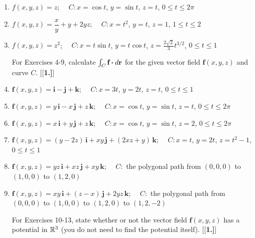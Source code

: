 \begin{enumerate}[\bfseries 1.]
 \item $f(x,y,z)=z$; $\quad C: x=\cos t$, $y=\sin t$, $z=t$, $0 \le t \le 2\pi$
 \item $f(x,y,z)=\dfrac{x}{y} + y + 2yz$; $\quad C: x=t^2$, $y=t$, $z=1$, $1 \le t \le 2$
 \item $f(x,y,z)=z^2$; $\quad C: x=t\sin t$, $y=t\cos t$, $z=\frac{2\sqrt{2}}{3}t^{3/2}$, $0 \le t \le 1$
\par\noindent For Exercises 4-9, calculate $\int_C \textbf{f} \bm{\cdot} d\textbf{r}$ for the given vector
 field $\textbf{f}(x,y,z)$ and curve $C$.
[{[\bfseries 1.]}]
 \item $\textbf{f}(x,y,z) = \textbf{i} - \textbf{j} + \textbf{k}$; $\quad C: x=3t$, $y=2t$, $z=t$, $0 \le t \le 1$
 \item $\textbf{f}(x,y,z) = y\,\textbf{i} - x\,\textbf{j} + z\,\textbf{k}$; $\quad C: x=\cos t$, $y=\sin t$, $z=t$,
  $0 \le t \le 2\pi$
 \item $\textbf{f}(x,y,z) = x\,\textbf{i} + y\,\textbf{j} + z\,\textbf{k}$; $\quad C: x=\cos t$, $y=\sin t$, $z=2$,
  $0 \le t \le 2\pi$
 \item $\textbf{f}(x,y,z) = (y-2z)\,\textbf{i} + xy\,\textbf{j} + (2xz+y)\,\textbf{k}$; $\quad C: x=t$, $y=2t$,
  $z = t^2 - 1$, $0 \le t \le 1$
 \item $\textbf{f}(x,y,z) = yz\,\textbf{i} + xz\,\textbf{j} + xy\,\textbf{k}$; $\quad C:$ the polygonal path from
  $(0,0,0)$ to $(1,0,0)$ to $(1,2,0)$
 \item $\textbf{f}(x,y,z) = xy\,\textbf{i} + (z-x)\,\textbf{j} + 2yz\,\textbf{k}$; $\quad C:$ the polygonal path from
  $(0,0,0)$ to $(1,0,0)$ to $(1,2,0)$ to $(1,2,-2)$
\par\noindent For Exercises 10-13, state whether or not the vector field $\textbf{f}(x,y,z)$ has a potential in
$\mathbb{R}^{3}$ (you do not need to find the potential itself).
[{[\bfseries 1.]}]
\end{enumerate}
